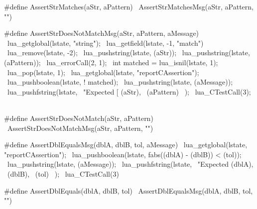 #define AssertStrMatches(aStr, aPattern) \
  AssertStrMatchesMsg(aStr, aPattern, "")
\stopCHeader

\stopTestSuite

\startTestSuite[assertStrNotMatch]

\startCHeader
#define AssertStrDoesNotMatchMsg(aStr, aPattern, aMessage) \
{                                                          \
  lua_getglobal(lstate, "string");                         \
  lua_getfield(lstate, -1, "match")                        \
  lua_remove(lstate, -2);                                  \
  lua_pushstring(lstate, (aStr));                          \
  lua_pushstring(lstate, (aPattern));                      \
  lua_errorCall(2, 1);                                     \
  int matched = lua_isnil(lstate, 1);                      \
  lua_pop(lstate, 1);                                      \
  lua_getglobal(lstate, "reportCAssertion");               \
  lua_pushboolean(lstate, ! matched);                      \
  lua_pushstring(lstate, (aMessage));                      \
  lua_pushfstring(lstate,                                  \
      "Expected [%
      (aStr),                                              \
      (aPattern)                                           \
    );                                                     \
  lua_CTestCall(3);                                        \
}

#define AssertStrDoesNotMatch(aStr, aPattern) \
  AssertStrDoesNotMatchMsg(aStr, aPattern, "")
\stopCHeader

\stopTestSuite

\startTestSuite[assertDblEquals]

\startCHeader
#define AssertDblEqualsMsg(dblA, dblB, tol, aMessage)        \
  lua_getglobal(lstate, "reportCAssertion");                 \
  lua_pushboolean(lstate, fabs((dblA) - (dblB)) < (tol));    \
  lua_pushstring(lstate, (aMessage));                        \
  lua_pushfstring(lstate,                                    \
      "Expected %
      (dblA),                                                \
      (dblB),                                                \
      (tol)                                                  \
    );                                                       \
  lua_CTestCall(3)

#define AssertDblEquals(dblA, dblB, tol) \
  AssertDblEqualsMsg(dblA, dblB, tol, "")
\stopCHeader

